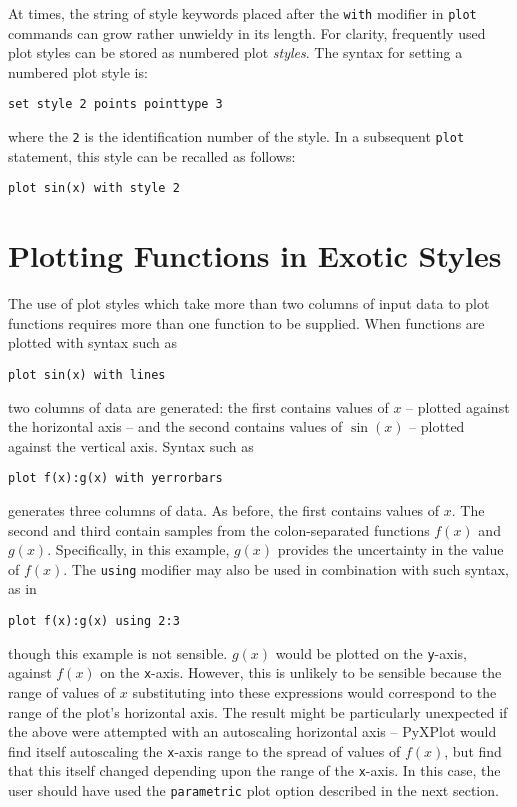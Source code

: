 At times, the string of style keywords placed after the {\tt with} modifier in
{\tt plot} commands can grow rather unwieldy in its length. For clarity,
frequently used plot styles can be stored as numbered plot {\it styles}.  The
syntax for setting a numbered plot style is:

\begin{verbatim}
set style 2 points pointtype 3
\end{verbatim}

\noindent where the {\tt 2} is the identification number of the style. In a
subsequent {\tt plot} statement, this style can be recalled as follows:

\begin{verbatim}
plot sin(x) with style 2
\end{verbatim}

\section{Plotting Functions in Exotic Styles}

The use of plot styles which take more than two columns of input data to plot
functions requires more than one function to be supplied.  When functions are
plotted with syntax such as

\begin{verbatim}
plot sin(x) with lines
\end{verbatim}

\noindent two columns of data are generated: the first contains values of $x$
-- plotted against the horizontal axis -- and the second contains values of
$\sin(x)$ -- plotted against the vertical axis. Syntax such as

\begin{verbatim}
plot f(x):g(x) with yerrorbars
\end{verbatim}

\noindent generates three columns of data. As before, the first contains values
of $x$. The second and third contain samples from the colon-separated functions
$f(x)$ and $g(x)$. Specifically, in this example, $g(x)$ provides the
uncertainty in the value of $f(x)$.  The {\tt using} modifier may also be used
in combination with such syntax, as in

\begin{verbatim}
plot f(x):g(x) using 2:3
\end{verbatim}

\noindent though this example is not sensible. $g(x)$ would be plotted on the
{\tt y}-axis, against $f(x)$ on the {\tt x}-axis. However, this is unlikely to be
sensible because the range of values of $x$ substituting into these expressions
would correspond to the range of the plot's horizontal axis. The result might
be particularly unexpected if the above were attempted with an autoscaling
horizontal axis -- PyXPlot would find itself autoscaling the {\tt x}-axis range
to the spread of values of $f(x)$, but find that this itself changed depending
upon the range of the {\tt x}-axis. In this case, the user should have used the
{\tt parametric} plot option described in the next section.

